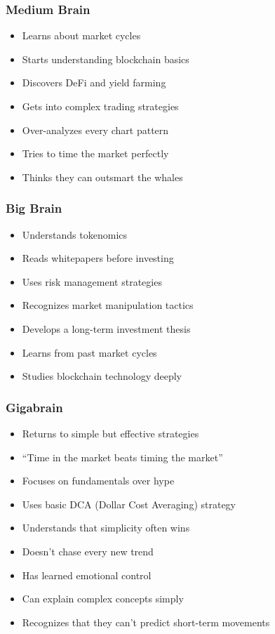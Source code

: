 \documentclass[
  letterpaper,
  DIV=11,
  numbers=noendperiod]{scrreprt}
\providecommand{\tightlist}{%
  \setlength{\itemsep}{0pt}\setlength{\parskip}{0pt}}\usepackage{longtable,booktabs,array}
\begin{document}
\subsubsection{Medium Brain}\label{medium-brain}

\begin{itemize}
\tightlist
\item
  Learns about market cycles
\item
  Starts understanding blockchain basics
\item
  Discovers DeFi and yield farming
\item
  Gets into complex trading strategies
\item
  Over-analyzes every chart pattern
\item
  Tries to time the market perfectly
\item
  Thinks they can outsmart the whales
\end{itemize}

\subsubsection{Big Brain}\label{big-brain}

\begin{itemize}
\tightlist
\item
  Understands tokenomics
\item
  Reads whitepapers before investing
\item
  Uses risk management strategies
\item
  Recognizes market manipulation tactics
\item
  Develops a long-term investment thesis
\item
  Learns from past market cycles
\item
  Studies blockchain technology deeply
\end{itemize}

\subsubsection{Gigabrain}\label{gigabrain}

\begin{itemize}
\tightlist
\item
  Returns to simple but effective strategies
\item
  ``Time in the market beats timing the market''
\item
  Focuses on fundamentals over hype
\item
  Uses basic DCA (Dollar Cost Averaging) strategy
\item
  Understands that simplicity often wins
\item
  Doesn't chase every new trend
\item
  Has learned emotional control
\item
  Can explain complex concepts simply
\item
  Recognizes that they can't predict short-term movements
\end{itemize}
\end{document}
